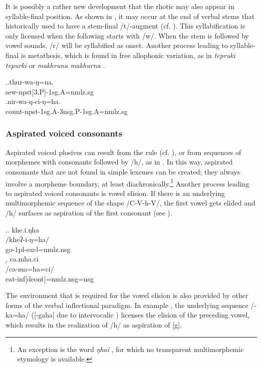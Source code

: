 It is possibly a rather new development that the rhotic may also appear in syllable-final position. As shown in  \Next, it may occur at the end of verbal stems that historically used to have a stem-final /t/-augment (cf. ). This syllabification is only licensed when the following  starts with /w/. When the stem is followed by vowel sounds, /r/ will be syllabified as onset. Another process leading to syllable-final  is metathesis, which is found in free allophonic variation, as in \emph{tepruki \ti tepurki}  or \emph{makhruna \ti makhurna} . 


\ex.\ag.thur-wa-ŋ=na.\\
sew{\sc -npst[3.P]-1sg.A=nmlz.sg}\\
\bg.nir-wa-ŋ-ci-ŋ=ha.\\
count{\sc -npst-1sg.A-3nsg.P-1sg.A=nmlz.sg}\\


 
\subsubsection{Aspirated voiced consonants}\label{asp-voiced}

Aspirated voiced plosives can result from the  rule (cf. ), or from sequences of morphemes with consonants followed by /h/, as in \Next[a]. In this way, aspirated consonants that are not found in simple lexemes can be created; they always involve a morpheme boundary, at least diachronically.\footnote{An exception is the word \emph{ŋhai} , for which no transparent multimorphemic etymology is available.} Another process leading to aspirated voiced consonants is vowel elision. If there is an underlying multimorphemic sequence of the shape /C-V-h-V/, the first vowel gets elided and /h/ surfaces as aspiration of the first consonant (see \Next[b]). 

\ex.\a. \glll khe.i.ŋha\\
/kheʔ-i-ŋ=ha/\\
go{\sc [pst]-1pl-excl=nmlz.nsg}\\
\b. \glll ca.mha.ci\\
/ca-ma=ha=ci/\\
eat{\sc -inf[deont]=nmlz.nsg=nsg}\\

The environment that is required for the vowel elision is also provided by other forms of the verbal inflectional paradigm. In example \Next, the underlying sequence /-ka=ha/ ([-gaha] due to intervocalic ) licenses the elision of the preceding vowel, which results in the realization of /h/ as aspiration of [g].

